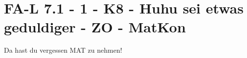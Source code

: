 \section{FA-L 7.1 - 1 - K8 - Huhu sei etwas geduldiger - ZO - MatKon}

\begin{beispiel}[FA-L 7.1]{1}
Da hast du vergessen MAT zu nehmen!
\end{beispiel}